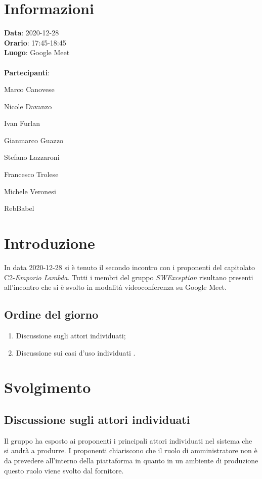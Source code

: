 \section{Informazioni}
\textbf{Data}: 2020-12-28\\
\textbf{Orario}: 17:45-18:45\\
\textbf{Luogo}: Google Meet\\\\
\textbf{Partecipanti}:\begin{list}{*}{\setlength{\itemsep}{0cm}}
	\item Marco Canovese
	\item Nicole Davanzo
	\item Ivan Furlan
	\item Gianmarco Guazzo
	\item Stefano Lazzaroni
	\item Francesco Trolese
	\item Michele Veronesi
	\item RebBabel
\end{list}

\section{Introduzione}
In data 2020-12-28 si è tenuto il secondo incontro con i proponenti del capitolato C2-\textit{Emporio Lambda}.
Tutti i membri del gruppo \textit{SWException} risultano presenti all'incontro che si è svolto in modalità videoconferenza su Google Meet.

\subsection{Ordine del giorno}
\begin{enumerate}
  	\item Discussione sugli attori individuati;
    \item Discussione sui casi d'uso individuati .
 
\end{enumerate}

\section{Svolgimento}


\subsection{Discussione sugli attori individuati}
Il gruppo ha esposto ai proponenti i principali attori individuati nel sistema che si andrà a produrre. 
I proponenti chiariscono che il ruolo di amministratore non è da prevedere all'interno della piattaforma in quanto in un ambiente di produzione questo ruolo viene svolto dal fornitore.

